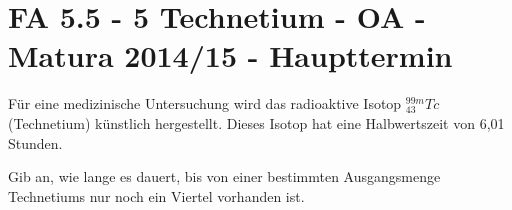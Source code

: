 \section{FA 5.5 - 5 Technetium - OA - Matura 2014/15 - Haupttermin}

\begin{beispiel}[FA 5.5]{1} %
Für eine medizinische Untersuchung wird das radioaktive Isotop $^{99m}_{43}Tc$ \mbox{(Technetium)} künstlich hergestellt. Dieses Isotop hat eine Halbwertszeit von 6,01 Stunden. \leer

Gib an, wie lange es dauert, bis von einer bestimmten Ausgangsmenge Technetiums nur
noch ein Viertel vorhanden ist.

\end{beispiel}